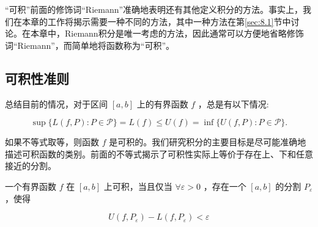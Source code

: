 “可积”前面的修饰词“Riemann”准确地表明还有其他定义积分的方法。事实上，我们在本章的工作将揭示需要一种不同的方法，其中一种方法在第\ref{sec:8.1}节中讨论。在本章中，Riemann积分是唯一考虑的方法，因此通常可以方便地省略修饰词“Riemann”，而简单地将函数称为“可积”。

\subsection{可积性准则}

总结目前的情况，对于区间 \(\left\lbrack  {a,b}\right\rbrack\) 上的有界函数 \(f\) ，总是有以下情况:

\[
\sup \{ L\left( {f,P}\right)  : P \in  \mathcal{P}\}  = L\left( f\right)  \leq  U\left( f\right)  = \inf \{ U\left( {f,P}\right)  : P \in  \mathcal{P}\} .
\]

如果不等式取等，则函数 \(f\) 是可积的。我们研究积分的主要目标是尽可能准确地描述可积函数的类别。前面的不等式揭示了可积性实际上等价于存在上、下和任意接近的分割。


\begin{Thm}\label{thm:7.2.8}
  一个有界函数 \(f\) 在 \(\left\lbrack  {a,b}\right\rbrack\) 上可积，当且仅当 \(\forall \varepsilon  > 0\) ，存在一个 \(\left\lbrack  {a,b}\right\rbrack\) 的分割 \({P}_{\varepsilon }\) ，使得

\[
U\left( {f,{P}_{\varepsilon }}\right)  - L\left( {f,{P}_{\varepsilon }}\right)  < \varepsilon
\]
\end{Thm}

